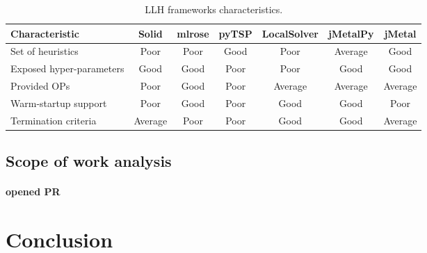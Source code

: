 \begin{table}[h!]
	\centering
	\begin{tabular}{l||cccccc}
		\textbf{Characteristic} & \textbf{Solid} & \textbf{mlrose} & \textbf{pyTSP} & \textbf{LocalSolver} & \textbf{jMetalPy} & \textbf{jMetal} \\
		\hline
		\hline
		Set of heuristics & \cellcolor{red!25}Poor & \cellcolor{red!25}Poor & \cellcolor{green!25}Good & \cellcolor{red!25}Poor & \cellcolor{yellow!25}Average & \cellcolor{green!25}Good \\
		
		Exposed hyper-parameters & \cellcolor{green!25}Good & \cellcolor{green!25}Good & \cellcolor{red!25}Poor & \cellcolor{red!25}Poor & \cellcolor{green!25}Good & \cellcolor{green!25}Good \\
		
		Provided OPs & \cellcolor{red!25}Poor & \cellcolor{green!25}Good & \cellcolor{red!25}Poor & \cellcolor{yellow!25}Average & \cellcolor{yellow!25}Average & \cellcolor{yellow!25}Average \\
		
		Warm-startup support & \cellcolor{red!25}Poor & \cellcolor{green!25}Good & \cellcolor{red!25}Poor & \cellcolor{green!25}Good & \cellcolor{green!25}Good & \cellcolor{red!25}Poor \\
		
		Termination criteria & \cellcolor{yellow!25}Average & \cellcolor{red!25}Poor & \cellcolor{red!25}Poor & \cellcolor{green!25}Good & \cellcolor{green!25}Good & \cellcolor{yellow!25}Average \\
	\end{tabular}
	\caption{LLH frameworks characteristics.}
	\label{iml: table llh selection}
\end{table}



\subsection{Scope of work analysis}
\paragraph{opened PR}

\section{Conclusion}
